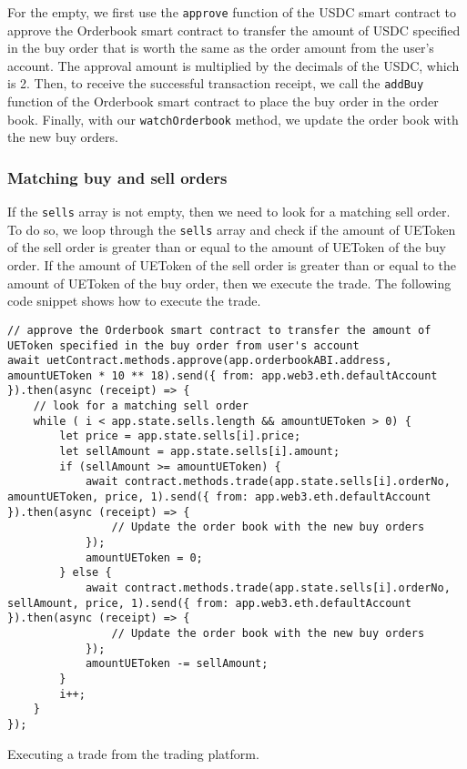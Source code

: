 For the empty, we first use the \texttt{approve} function of the USDC smart contract to approve the Orderbook smart contract to transfer the amount of USDC
specified in the buy order that is worth the same as the order amount from the user's account.  The approval amount is multiplied by the decimals of the USDC, which is 2. Then, to receive the successful transaction receipt, we call the \texttt{addBuy} function of the Orderbook smart contract to place the buy order
in the order book. Finally, with our \texttt{watchOrderbook} method, we update the order book with the new buy orders.


\subsubsection{Matching buy and sell orders}


If the \texttt{sells} array is not empty, then we need to look for a matching sell order. To do so, we loop through the \texttt{sells} array and check if
the amount of UEToken of the sell order is greater than or equal to the amount of UEToken of the buy order. If the amount of UEToken of the sell order
is greater than or equal to the amount of UEToken of the buy order, then we execute the trade. The following code snippet shows how to execute the trade.

\begin{listing}[H]
    \begin{verbatim}
// approve the Orderbook smart contract to transfer the amount of UEToken specified in the buy order from user's account
await uetContract.methods.approve(app.orderbookABI.address, amountUEToken * 10 ** 18).send({ from: app.web3.eth.defaultAccount }).then(async (receipt) => {
    // look for a matching sell order
    while ( i < app.state.sells.length && amountUEToken > 0) {
        let price = app.state.sells[i].price;
        let sellAmount = app.state.sells[i].amount;
        if (sellAmount >= amountUEToken) {
            await contract.methods.trade(app.state.sells[i].orderNo, amountUEToken, price, 1).send({ from: app.web3.eth.defaultAccount }).then(async (receipt) => {
                // Update the order book with the new buy orders
            });
            amountUEToken = 0;
        } else {
            await contract.methods.trade(app.state.sells[i].orderNo, sellAmount, price, 1).send({ from: app.web3.eth.defaultAccount }).then(async (receipt) => {
                // Update the order book with the new buy orders
            });
            amountUEToken -= sellAmount;
        }
        i++;
    }
});
    \end{verbatim}
    \caption{Executing a trade from the trading platform.}
    \label{lst:execute_trade}
\end{listing}


